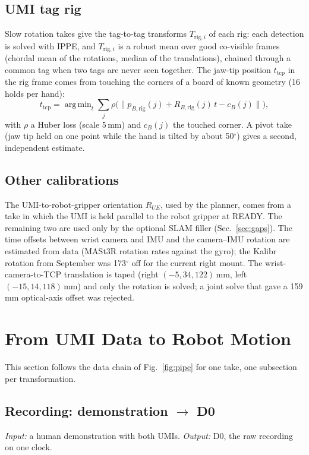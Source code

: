 \documentclass[conference,10pt]{IEEEtran}
\newcommand{\mm}{\,mm\xspace}
\DeclareMathOperator*{\argmin}{arg\,min}
\begin{document}
\subsection{UMI tag rig}\label{sec:rig}
Slow rotation takes give the tag-to-tag transforms $T_{\mathrm{rig},i}$ of each rig: each detection is solved with IPPE,
and $T_{\mathrm{rig},i}$ is a robust mean over good co-visible frames (chordal mean of the rotations, median of the
translations), chained through a common tag when two tags are never seen together. The jaw-tip position $t_\mathrm{tcp}$ in
the rig frame comes from touching the corners of a board of known geometry (16 holds per hand):
\begin{equation}
t_\mathrm{tcp}=\argmin_{t}\sum_{j}\rho\big(\lVert p_{B,\mathrm{rig}}(j)+R_{B,\mathrm{rig}}(j)\,t-c_B(j)\rVert\big),
\end{equation}
with $\rho$ a Huber loss (scale 5\mm) and $c_B(j)$ the touched corner. A pivot take (jaw tip held on one point while the
hand is tilted by about 50$^\circ$) gives a second, independent estimate.

\subsection{Other calibrations}\label{sec:othercal}
The UMI-to-robot-gripper orientation $R_{UE}$, used by the planner, comes from a take in which the UMI is held parallel to
the robot gripper at READY. The remaining two are used only by the optional SLAM filler (Sec.~\ref{sec:gaps}). The time
offsets between wrist camera and IMU and the camera--IMU rotation are estimated from data (MASt3R rotation rates against
the gyro); the Kalibr rotation from September was 173$^\circ$ off for the current right mount. The wrist-camera-to-TCP
translation is taped (right $(-5, 34, 122)$\mm, left $(-15, 14, 118)$\mm) and only the rotation is solved; a joint solve
that gave a 159\mm optical-axis offset was rejected.

\section{From UMI Data to Robot Motion}\label{sec:conv}
This section follows the data chain of Fig.~\ref{fig:pipe} for one take, one subsection per transformation.

\subsection{Recording: demonstration $\to$ D0}\label{sec:rec}
\emph{Input:} a human demonstration with both UMIs. \emph{Output:} D0, the raw recording on one clock.
\end{document}
